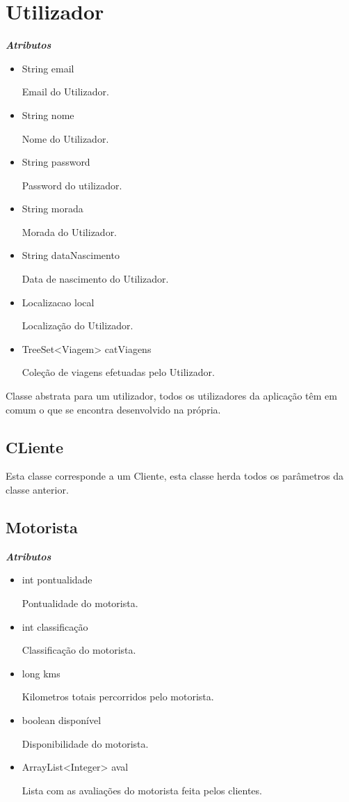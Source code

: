 \documentclass[12pt,a4paper]{report}
\begin{document}
\section{Utilizador}
\emph{\bfseries Atributos}
\begin{itemize}
    \item String email \par
Email do Utilizador.
    \item String nome \par
Nome do Utilizador.
    \item String password \par
Password do utilizador.
    \item String morada \par
Morada do Utilizador.
    \item String dataNascimento \par
Data de nascimento do Utilizador.
    \item Localizacao local \par
Localização do Utilizador.
    \item TreeSet<Viagem> catViagens \par
Coleção de viagens efetuadas pelo Utilizador.
\end{itemize}

Classe abstrata para um utilizador, todos os utilizadores da aplicação têm em comum o que se encontra desenvolvido na própria. 

\subsection{CLiente}
Esta classe corresponde a um Cliente, esta classe herda todos os parâmetros da classe anterior.

\subsection{Motorista}
\emph{\bfseries Atributos}
\begin{itemize}
    \item int pontualidade \par
Pontualidade do motorista.
    \item int classificação \par
Classificação do motorista.
    \item long kms \par
Kilometros totais percorridos pelo motorista. 
    \item  boolean disponível \par
Disponibilidade do motorista.
    \item  ArrayList<Integer> aval \par
Lista com as avaliações do motorista feita pelos clientes.
\end{itemize}
\end{document}
